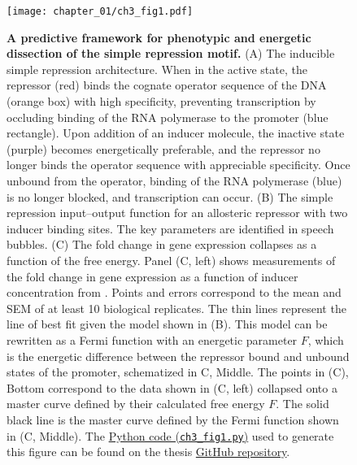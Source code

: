 \documentclass[12pt]{caltech_thesis}
\begin{document}
\hypertarget{fig:mut_induction_summary}{%
\begin{figure}
\centering
\texttt{[image: chapter\_01/ch3\_fig1.pdf]}
\caption[{Summary of Chapter 2. A predictive framework for dissection of
the simple repression motif}]{\textbf{A predictive framework for
phenotypic and energetic dissection of the simple repression motif.} (A)
The inducible simple repression architecture. When in the active state,
the repressor (red) binds the cognate operator sequence of the DNA
(orange box) with high specificity, preventing transcription by
occluding binding of the RNA polymerase to the promoter (blue
rectangle). Upon addition of an inducer molecule, the inactive state
(purple) becomes energetically preferable, and the repressor no longer
binds the operator sequence with appreciable specificity. Once unbound
from the operator, binding of the RNA polymerase (blue) is no longer
blocked, and transcription can occur. (B) The simple repression
input--output function for an allosteric repressor with two inducer
binding sites. The key parameters are identified in speech bubbles. (C)
The fold change in gene expression collapses as a function of the free
energy. Panel (C, left) shows measurements of the fold change in gene
expression as a function of inducer concentration from
\textcite{razo-mejia2018}. Points and errors correspond to the mean and
SEM of at least 10 biological replicates. The thin lines represent the
line of best fit given the model shown in (B). This model can be
rewritten as a Fermi function with an energetic parameter \(F\), which
is the energetic difference between the repressor bound and unbound
states of the promoter, schematized in C, Middle. The points in (C),
Bottom correspond to the data shown in (C, left) collapsed onto a master
curve defined by their calculated free energy \(F\). The solid black
line is the master curve defined by the Fermi function shown in (C,
Middle). The
\href{https://github.com/gchure/phd/blob/master/src/chapter_03/code/ch3_fig1.py}{Python
code (\texttt{ch3\_fig1.py})} used to generate this figure can be found
on the thesis \href{https://github.com/gchure/phd}{GitHub repository}.}
\label{fig:mut_induction_summary}
\end{figure}
}
\end{document}
